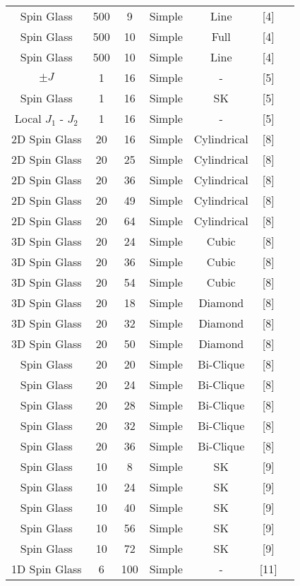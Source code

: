 \documentclass{standalone}
\begin{document}
\begin{tabular}{ |c|c|c|c|c|c|c| }
    Spin Glass & 500 & 9 & Simple & Line & [4] \\
    Spin Glass & 500 & 10 & Simple & Full & [4] \\
    Spin Glass & 500 & 10 & Simple & Line & [4] \\
    $\pm J$ & 1 & 16 & Simple & - & [5] \\
    Spin Glass & 1 & 16 & Simple & SK & [5] \\
    Local $J_1$ - $J_2$ & 1 & 16 & Simple & - & [5] \\
    2D Spin Glass & 20 & 16 & Simple & Cylindrical & [8] \\
    2D Spin Glass & 20 & 25 & Simple & Cylindrical & [8] \\
    2D Spin Glass & 20 & 36 & Simple & Cylindrical & [8] \\
    2D Spin Glass & 20 & 49 & Simple & Cylindrical & [8] \\
    2D Spin Glass & 20 & 64 & Simple & Cylindrical & [8] \\
    3D Spin Glass & 20 & 24 & Simple & Cubic & [8] \\
    3D Spin Glass & 20 & 36 & Simple & Cubic & [8] \\
    3D Spin Glass & 20 & 54 & Simple & Cubic & [8] \\
    3D Spin Glass & 20 & 18 & Simple & Diamond & [8] \\
    3D Spin Glass & 20 & 32 & Simple & Diamond & [8] \\
    3D Spin Glass & 20 & 50 & Simple & Diamond & [8] \\
    Spin Glass & 20 & 20 & Simple & Bi-Clique & [8] \\
    Spin Glass & 20 & 24 & Simple & Bi-Clique & [8] \\
    Spin Glass & 20 & 28 & Simple & Bi-Clique & [8] \\
    Spin Glass & 20 & 32 & Simple & Bi-Clique & [8] \\
    Spin Glass & 20 & 36 & Simple & Bi-Clique & [8] \\
    Spin Glass & 10 & 8 & Simple & SK & [9] \\
    Spin Glass & 10 & 24 & Simple & SK & [9] \\
    Spin Glass & 10 & 40 & Simple & SK & [9] \\
    Spin Glass & 10 & 56 & Simple & SK & [9] \\
    Spin Glass & 10 & 72 & Simple & SK & [9] \\
    1D Spin Glass & 6 & 100 & Simple & - & [11] \\

\end{tabular}
\end{document}
